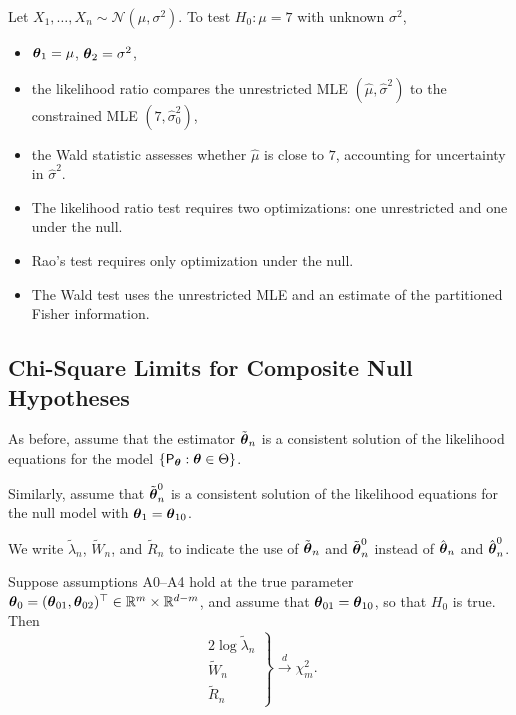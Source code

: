 \begin{ex}\label{ex:gaussian-composite}
Let \(X_1,\dots,X_n \sim \mathcal{N}(\mu,\sigma^2)\).
To test \(H_0 : \mu = 7\) with unknown \(\sigma^2\),
\begin{itemize}[]
\item \(\boldsymbol{\theta}_1 = \mu\), \(\boldsymbol{\theta}_2 = \sigma^2\),
\item the likelihood ratio compares the unrestricted MLE
\((\hat{\mu},\hat{\sigma}^2)\) to the constrained MLE \((7,\hat{\sigma}_0^2)\),
\item the Wald statistic assesses whether \(\hat{\mu}\) is close to \(7\),
accounting for uncertainty in \(\hat{\sigma}^2\).
\end{itemize}
\end{ex}

\begin{note}\label{note:computation}
    \leavevmode
\begin{itemize}[]
\item The likelihood ratio test requires two optimizations:
one unrestricted and one under the null.
\item Rao's test requires only optimization under the null.
\item The Wald test uses the unrestricted MLE and an estimate of the
partitioned Fisher information.
\end{itemize}
\end{note}

\subsection{Chi-Square Limits for Composite Null Hypotheses}

As before, assume that the estimator $\tilde{\boldsymbol{\theta}}_n$ is a consistent solution of the likelihood equations for the model
$\{\mathsf{P}_{\boldsymbol{\theta}} : \boldsymbol{\theta} \in \Theta\}$.

Similarly, assume that $\tilde{\boldsymbol{\theta}}_n^0$ is a consistent solution of the likelihood equations for the null model with
$\boldsymbol{\theta}_1 = \boldsymbol{\theta}_{10}$.

We write $\tilde{\lambda}_n$, $\widetilde{W}_n$, and $\widetilde{R}_n$ to indicate the use of $\tilde{\boldsymbol{\theta}}_n$ and
$\tilde{\boldsymbol{\theta}}_n^0$ instead of $\hat{\boldsymbol{\theta}}_n$ and $\hat{\boldsymbol{\theta}}_n^0$.

\begin{theo}\label{thm:wilks}
Suppose assumptions A0--A4 hold at the true parameter
$\boldsymbol{\theta}_0 = (\boldsymbol{\theta}_{01}, \boldsymbol{\theta}_{02})^\top \in \mathbb{R}^m \times \mathbb{R}^{d-m}$,
and assume that $\boldsymbol{\theta}_{01} = \boldsymbol{\theta}_{10}$, so that $H_0$ is true. Then
\begin{equation*}
\left.
\begin{array}{l}
2 \log \tilde{\lambda}_n \\
\widetilde{W}_n \\
\widetilde{R}_n
\end{array}
\right\}
\xrightarrow{d} \chi^2_m .
\end{equation*}
\end{theo}

